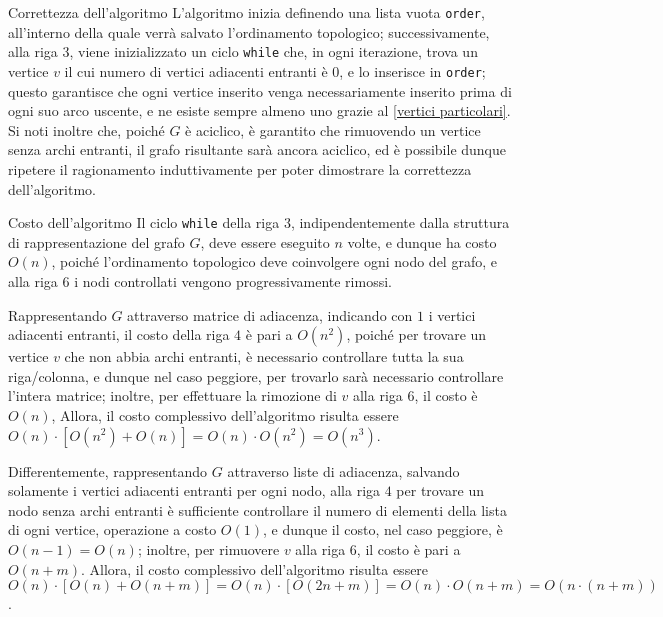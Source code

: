 \documentclass[a4paper, 12pt]{report}
\begin{document}
    \begin{framedobs}{Correttezza dell'algoritmo}
        L'algoritmo inizia definendo una lista vuota \texttt{order}, all'interno della quale verrà salvato l'ordinamento topologico; successivamente, alla riga $3$, viene inizializzato un ciclo \texttt{while} che, in ogni iterazione, trova un vertice $v$ il cui numero di vertici adiacenti entranti è $0$, e lo inserisce in \texttt{order}; questo garantisce che ogni vertice inserito venga necessariamente inserito prima di ogni suo arco uscente, e ne esiste sempre almeno uno grazie al \cref{vertici particolari}. Si noti inoltre che, poiché $G$ è aciclico, è garantito che rimuovendo un vertice senza archi entranti, il grafo risultante sarà ancora aciclico, ed è possibile dunque ripetere il ragionamento induttivamente per poter dimostrare la correttezza dell'algoritmo.
    \end{framedobs}

    \begin{framedobs}{Costo dell'algoritmo}
        Il ciclo \texttt{while} della riga $3$, indipendentemente dalla struttura di rappresentazione del grafo $G$, deve essere eseguito $n$ volte, e dunque ha costo $O(n)$, poiché l'ordinamento topologico deve coinvolgere ogni nodo del grafo, e alla riga $6$ i nodi controllati vengono progressivamente rimossi.

        Rappresentando $G$ attraverso matrice di adiacenza, indicando con $1$ i vertici adiacenti entranti, il costo della riga $4$ è pari a $O(n^2)$, poiché per trovare un vertice $v$ che non abbia archi entranti, è necessario controllare tutta la sua riga/colonna, e dunque nel caso peggiore, per trovarlo sarà necessario controllare l'intera matrice; inoltre, per effettuare la rimozione di $v$ alla riga $6$, il costo è $O(n)$, Allora, il costo complessivo dell'algoritmo risulta essere $O(n) \cdot [O(n^2) + O(n)]= O(n) \cdot O(n^2) = O(n^3)$.

        Differentemente, rappresentando $G$ attraverso liste di adiacenza, salvando solamente i vertici adiacenti entranti per ogni nodo, alla riga $4$ per trovare un nodo senza archi entranti è sufficiente controllare il numero di elementi della lista di ogni vertice, operazione a costo $O(1)$, e dunque il costo, nel caso peggiore, è $O(n - 1) = O(n)$; inoltre, per rimuovere $v$ alla riga $6$, il costo è pari a $O(n + m)$. Allora, il costo complessivo dell'algoritmo risulta essere $O(n) \cdot [O(n) + O(n + m)] = O(n) \cdot [O(2n + m)] = O(n) \cdot O(n + m) = O(n \cdot (n +m))$.
    \end{framedobs}
\end{document}
